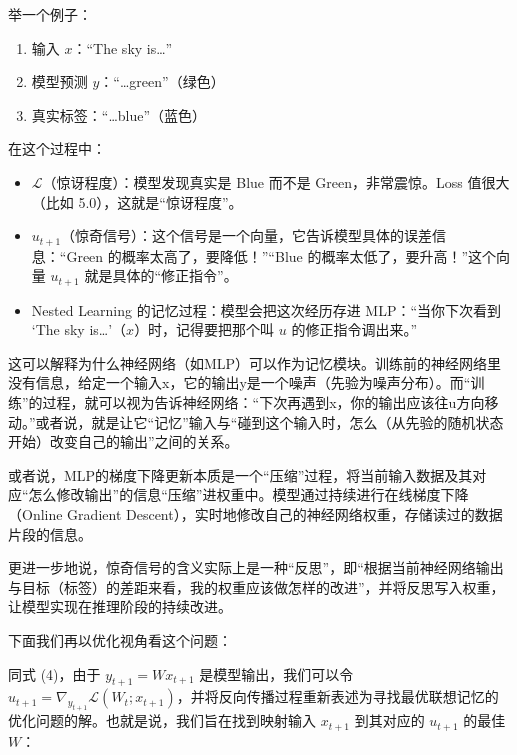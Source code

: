 举一个例子：

\begin{enumerate}
\def\labelenumi{\arabic{enumi}.}
\tightlist
\item
  输入 \(x\)：``The sky is\ldots{}''
\item
  模型预测 \(y\)：``\ldots green''（绿色）
\item
  真实标签：``\ldots blue''（蓝色）
\end{enumerate}

在这个过程中：

\begin{itemize}
\tightlist
\item
  \(\mathcal{L}\)（惊讶程度）：模型发现真实是 Blue 而不是 Green，非常震惊。Loss 值很大（比如 5.0），这就是``惊讶程度''。
\item
  \(u_{t+1}\)（惊奇信号）：这个信号是一个向量，它告诉模型具体的误差信息：``Green 的概率太高了，要降低！''``Blue 的概率太低了，要升高！''这个向量 \(u_{t+1}\) 就是具体的``修正指令''。
\item
  Nested Learning 的记忆过程：模型会把这次经历存进 MLP：``当你下次看到 `The sky is\ldots{}'（\(x\)）时，记得要把那个叫 \(u\) 的修正指令调出来。''
\end{itemize}

这可以解释为什么神经网络（如MLP）可以作为记忆模块。训练前的神经网络里没有信息，给定一个输入x，它的输出y是一个噪声（先验为噪声分布）。而``训练''的过程，就可以视为告诉神经网络：``下次再遇到x，你的输出应该往u方向移动。''或者说，就是让它``记忆''输入与``碰到这个输入时，怎么（从先验的随机状态开始）改变自己的输出''之间的关系。

或者说，MLP的梯度下降更新本质是一个``压缩''过程，将当前输入数据及其对应``怎么修改输出''的信息``压缩''进权重中。模型通过持续进行在线梯度下降（Online Gradient Descent），实时地修改自己的神经网络权重，存储读过的数据片段的信息。

更进一步地说，惊奇信号的含义实际上是一种``反思''，即``根据当前神经网络输出与目标（标签）的差距来看，我的权重应该做怎样的改进''，并将反思写入权重，让模型实现在推理阶段的持续改进。

下面我们再以优化视角看这个问题：

同式 (4)，由于 \(y_{t+1}=Wx_{t+1}\) 是模型输出，我们可以令 \(u_{t+1}=\nabla_{y_{t+1}}\mathcal{L}(W_t;x_{t+1})\)，并将反向传播过程重新表述为寻找最优联想记忆的优化问题的解。也就是说，我们旨在找到映射输入 \(x_{t+1}\) 到其对应的 \(u_{t+1}\) 的最佳 \(W\)：

